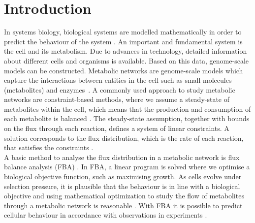 \thispagestyle{plain}
\section{Introduction}

In systems biology, biological systems are modelled mathematically in order to predict the behaviour of the system \cite{intro_computational_systems_biology}. An important and fundamental system is the cell and its metabolism.
Due to advances in technology, detailed information about different cells and organisms is available. Based on this data, genome-scale models can be constructed. Metabolic networks are genome-scale models which capture the interactions between entities in the cell such as small molecules (metabolites) and enzymes~\cite{intro_computational_systems_biology}. 
A commonly used approach to study metabolic networks are constraint-based methods, where we assume a steady-state of metabolites within the cell, which means that the production and consumption of each metabolite is balanced \cite{palsson_systems_biology}. The steady-state assumption, together with bounds on the flux through each reaction, defines a system of linear constraints. A solution corresponds to the flux distribution, which is the rate of each reaction, that satisfies the constraints \cite{intro_computational_systems_biology}. \\ %
A basic method to analyse the flux distribution in a metabolic network is flux balance analysis (FBA) \cite{FBA}. In FBA, a linear program is solved where we optimise a biological objective function, such as maximising growth. As cells evolve under selection pressure, it is plausible that the behaviour is in line with a biological objective and using mathematical optimization to study the flow of metabolites through a metabolic network is reasonable \cite{palsson_systems_biology}. With FBA it is possible to predict cellular behaviour in accordance with observations in experiments \cite{FBA}. \\
